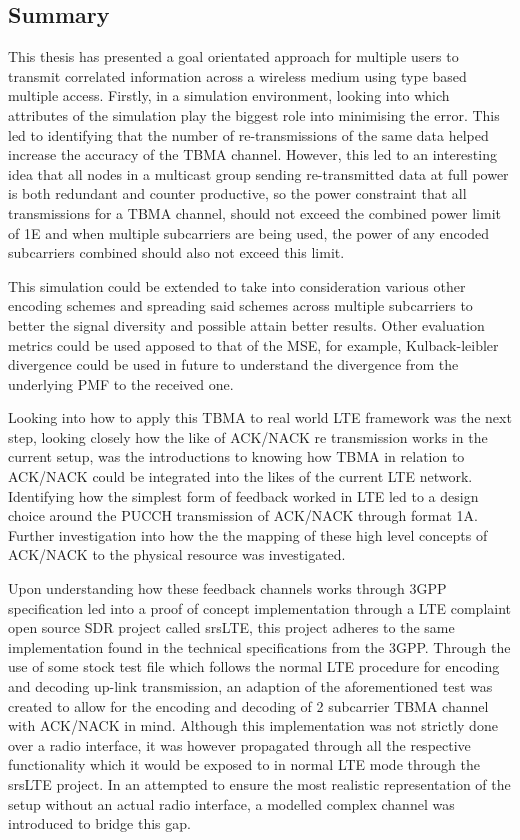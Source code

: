 \documentclass{article}
\begin{document}
\subsection{Summary}
This thesis has presented a goal orientated approach for multiple users to transmit correlated information across a wireless medium using type based multiple access. Firstly, in a simulation environment, looking into which attributes of the simulation play the biggest role into minimising the error. This led to identifying that the number of re-transmissions of the same data helped increase the accuracy of the TBMA channel. However, this led to an interesting idea that all nodes in a multicast group sending re-transmitted data at full power is both redundant and counter productive, so the power constraint that all transmissions for a TBMA channel, should not exceed the combined power limit of 1E and when multiple subcarriers are being used, the power of any encoded subcarriers combined should also not exceed this limit.

This simulation could be extended to take into consideration various other encoding schemes and spreading said schemes across multiple subcarriers to better the signal diversity and possible attain better results. Other evaluation metrics could be used apposed to that of the MSE, for example, Kulback-leibler divergence could be used in future to understand the divergence from the underlying PMF to the received one.  

Looking into how to apply this TBMA to real world LTE framework was the next step, looking closely how the like of ACK/NACK re transmission works in the current setup, was the introductions to knowing how TBMA in relation to ACK/NACK could be integrated into the likes of the current LTE network. Identifying how the simplest form of feedback worked in LTE led to a design choice around the PUCCH transmission of ACK/NACK through format 1A. Further investigation into how the the  mapping of these high level concepts of ACK/NACK to the physical resource was investigated. 

Upon understanding how these feedback channels works through 3GPP specification led into a proof of concept implementation through a LTE complaint open source SDR project called srsLTE, this project adheres to the same implementation found in the technical specifications from the 3GPP. Through the use of some stock test file which follows the normal LTE procedure for encoding and decoding up-link transmission, an adaption of the aforementioned test was created to allow for the encoding and decoding of 2 subcarrier TBMA channel with ACK/NACK in mind. Although this implementation was not strictly done over a radio interface, it was however propagated through all the respective functionality which it would be exposed to in normal LTE mode through the srsLTE project. In an attempted to ensure the most realistic representation of the setup without an actual radio interface, a modelled complex channel was introduced to bridge this gap. 
\end{document}
